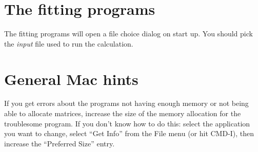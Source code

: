 

\section{The fitting programs}

The fitting programs will open a file choice dialog on start up.  You
should pick the {\em input} file used to run the calculation.

\section{General Mac hints}

If you get errors about the programs not having enough memory or not
being able to allocate matrices, increase the size of the memory
allocation for the troublesome program.  If you don't know how to do
this:  select the application you want to change, select ``Get
Info'' from the File menu (or hit CMD-I), then increase the
``Preferred Size'' entry. 

